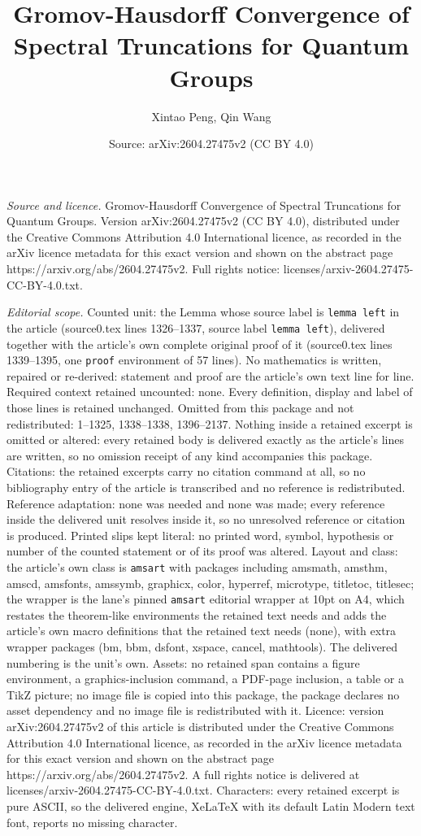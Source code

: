 \documentclass[10pt,a4paper]{amsart}
\title[Gromov-Hausdorff Convergence of Spectral Truncations for Qua]{Gromov-Hausdorff Convergence of Spectral Truncations for Quantum Groups}
\author{Xintao Peng, Qin Wang}
\date{Source: arXiv:2604.27475v2 (CC BY 4.0)}
\begin{document}
\maketitle

\noindent\emph{Source and licence.} Gromov-Hausdorff Convergence of Spectral Truncations for Quantum Groups. Version arXiv:2604.27475v2 (CC BY 4.0), distributed under the Creative Commons Attribution 4.0 International licence, as recorded in the arXiv licence metadata for this exact version and shown on the abstract page https://arxiv.org/abs/2604.27475v2. Full rights notice: licenses/arxiv-2604.27475-CC-BY-4.0.txt.\par\smallskip

\noindent\textit{Editorial scope.} Counted unit: the Lemma whose source label is \texttt{lemma left} in the article (source0.tex lines 1326--1337, source label \texttt{lemma left}), delivered together with the article's own complete original proof of it (source0.tex lines 1339--1395, one \texttt{proof} environment of 57 lines). No mathematics is written, repaired or re-derived: statement and proof are the article's own text line for line. Required context retained uncounted: none. Every definition, display and label of those lines is retained unchanged. Omitted from this package and not redistributed: 1--1325, 1338--1338, 1396--2137. Nothing inside a retained excerpt is omitted or altered: every retained body is delivered exactly as the article's lines are written, so no omission receipt of any kind accompanies this package. Citations: the retained excerpts carry no citation command at all, so no bibliography entry of the article is transcribed and no reference is redistributed. Reference adaptation: none was needed and none was made; every reference inside the delivered unit resolves inside it, so no unresolved reference or citation is produced. Printed slips kept literal: no printed word, symbol, hypothesis or number of the counted statement or of its proof was altered. Layout and class: the article's own class is \texttt{amsart} with packages including amsmath, amsthm, amscd, amsfonts, amssymb, graphicx, color, hyperref, microtype, titletoc, titlesec; the wrapper is the lane's pinned \texttt{amsart} editorial wrapper at 10pt on A4, which restates the theorem-like environments the retained text needs and adds the article's own macro definitions that the retained text needs (none), with extra wrapper packages (bm, bbm, dsfont, xspace, cancel, mathtools). The delivered numbering is the unit's own. Assets: no retained span contains a figure environment, a graphics-inclusion command, a PDF-page inclusion, a table or a TikZ picture; no image file is copied into this package, the package declares no asset dependency and no image file is redistributed with it. Licence: version arXiv:2604.27475v2 of this article is distributed under the Creative Commons Attribution 4.0 International licence, as recorded in the arXiv licence metadata for this exact version and shown on the abstract page https://arxiv.org/abs/2604.27475v2. A full rights notice is delivered at licenses/arxiv-2604.27475-CC-BY-4.0.txt. Characters: every retained excerpt is pure ASCII, so the delivered engine, XeLaTeX with its default Latin Modern text font, reports no missing character.
\end{document}
